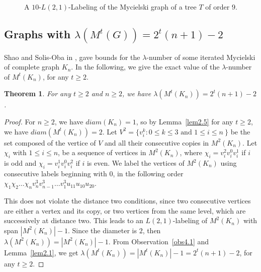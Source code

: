 \documentclass{article}
\newtheorem{theorem} {Theorem}
\newtheorem{open problem} {Open Problem}
\numberwithin{lemma}{section}
\numberwithin{theorem}{section}
\numberwithin{cor}{section}
\numberwithin{prop}{section}
\numberwithin{con}{section}
\numberwithin{claim}{section}
\numberwithin{obs}{section}
\numberwithin{dnt}{section}
\begin{document}
\begin{figure}[h]
	\caption{\label{fig7} A $10$-$L(2,1)$-Labeling of the Mycielski graph of a tree $T$ of order $9$.}
\end{figure}

\subsection{Graphs with $\lambda(M^t(G))=2^t(n+1)-2$ }
Shao and Solis-Oba in \cite{shao}, gave bounds for the $\lambda$-number of some iterated Mycielski of complete graph $K_n$. In the following, we give the exact value of the $\lambda$-number of $M^t(K_n)$, for any $t\geq 2$.
\begin{theorem}\label{th4.2}
	For any $t\geq 2$ and $n\geq 2$, we have $\lambda(M^t(K_n))=2^t(n+1)-2$.	
\end{theorem}
\begin{proof}
	For $n\geq 2$, we have  $diam(K_n)=1$, so by Lemma~\ref{lem2.5} for any $t\geq 2$, we have $diam(M^t(K_n))=2$. Let $V^2=\{v^k_i :0\leq k \leq 3 \text{ and } 1\leq i\leq n \ \}$ be the set composed of the vertice of $V$ and all their consecutive copies in $M^2(K_n)$. Let $\chi_i$ with $1\leq i\leq n$, be a sequence of vertices in $M^2(K_n)$, where $\chi_i=v^2_iv^0_iv^1_i$ if $i$ is odd and $\chi_i=v^1_iv^0_iv^2_i$ if $i$ is even.
	We label the vertices of $M^2(K_n)$ using consecutive labels beginning with $0$, in the following order $\chi_1\chi_2\ldots \chi_nv^3_nv^3_{n-1}\ldots v^3_1u_{11}u_{10}u_{20}$.\par
	This does not violate the distance two conditions, since two consecutive vertices are either a vertex and its copy, or two vertices from the same level, which are successively at distance two. This leads to an $L(2,1)$-labeling of $M^2(K_n)$ with span $|M^2(K_n)|-1$. Since the diameter is $2$, then $\lambda(M^2(K_n))=|M^2(K_n)|-1$. From Observation~\ref{obs4.1} and Lemma~\ref{lem2.1}, we get $\lambda(M^t(K_n))=|M^t(K_n)|-1=2^t(n+1)-2$, for any $t\geq 2$.    	
\end{proof}
\end{document}
